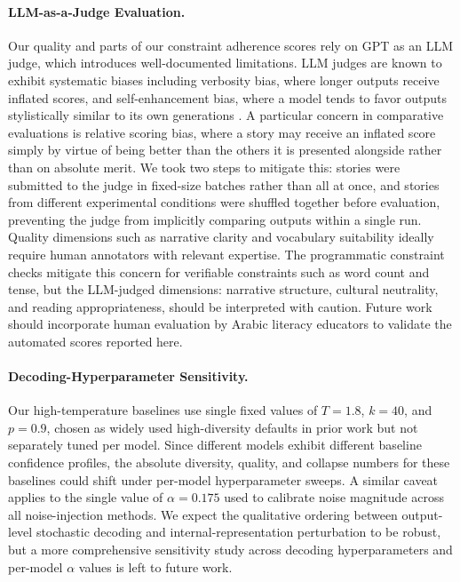 \documentclass[11pt]{article}
\begin{document}
\paragraph{LLM-as-a-Judge Evaluation.}
Our quality and parts of our constraint adherence scores rely on GPT as an LLM judge, which introduces well-documented limitations. LLM judges are known to exhibit systematic biases including verbosity bias, where longer outputs receive inflated scores, and self-enhancement bias, where a model tends to favor outputs stylistically similar to its own generations \cite{chen-etal-2024-humans}. A particular concern in comparative evaluations is relative scoring bias, where a story may receive an inflated score simply by virtue of being better than the others it is presented alongside rather than on absolute merit. We took two steps to mitigate this: stories were submitted to the judge in fixed-size batches rather than all at once, and stories from different experimental conditions were shuffled together before evaluation, preventing the judge from implicitly comparing outputs within a single run. Quality dimensions such as narrative clarity and vocabulary suitability ideally require human annotators with relevant expertise. The programmatic constraint checks mitigate this concern for verifiable constraints such as word count and tense, but the LLM-judged dimensions: narrative structure, cultural neutrality, and reading appropriateness, should be interpreted with caution. Future work should incorporate human evaluation by Arabic literacy educators to validate the automated scores reported here.

\paragraph{Decoding-Hyperparameter Sensitivity.}
Our high-temperature baselines use single fixed values of $T = 1.8$, $k = 40$, and $p = 0.9$, chosen as widely used high-diversity defaults in prior work but not separately tuned per model. Since different models exhibit different baseline confidence profiles, the absolute diversity, quality, and collapse numbers for these baselines could shift under per-model hyperparameter sweeps. A similar caveat applies to the single value of $\alpha = 0.175$ used to calibrate noise magnitude across all noise-injection methods. We expect the qualitative ordering between output-level stochastic decoding and internal-representation perturbation to be robust, but a more comprehensive sensitivity study across decoding hyperparameters and per-model $\alpha$ values is left to future work.
\end{document}
